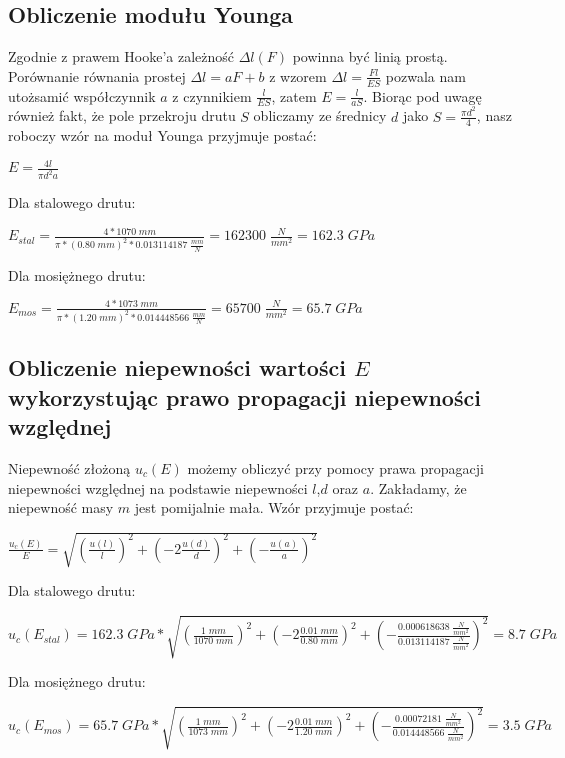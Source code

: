 \documentclass[12pt]{article}
\begin{document}
\subsection{Obliczenie modułu Younga}
Zgodnie z prawem Hooke'a zależność  $\Delta{l}(F)$ powinna być linią prostą. Porównanie równania prostej $\Delta{l} = aF + b$ z wzorem $\Delta{l}=\frac{Fl}{ES}$ pozwala nam utożsamić współczynnik $a$ z czynnikiem $\frac{l}{ES}$, zatem $E=\frac{l}{aS}$. Biorąc pod uwagę również fakt, że pole przekroju drutu $S$
obliczamy ze średnicy $d$ jako $S=\frac{\pi{d^2}}{4}$, nasz roboczy wzór na moduł Younga przyjmuje postać:
\begin{center}
\LARGE $E=\frac{4l}{\pi{d^2}a}$
\end{center}
Dla stalowego drutu:
\begin{center}
\LARGE $E_{stal}=\frac{4*1070\;mm}{\pi*(0.80\;mm)^2*0.013114187 \;\frac{mm}{N}} = 162300\;\frac{N}{mm^2} = 162.3\;GPa $
\end{center}
Dla mosiężnego drutu:
\begin{center}
\LARGE $E_{mos}=\frac{4*1073\;mm}{\pi*(1.20\;mm)^2*0.014448566 \;\frac{mm}{N}} = 65700\;\frac{N}{mm^2} = 65.7\;GPa $
\end{center}
\subsection{Obliczenie niepewności wartości $E$ wykorzystując prawo \newline propagacji niepewności względnej}
Niepewność złożoną $u_c(E)$ możemy obliczyć przy pomocy prawa propagacji niepewności względnej na podstawie niepewności $l$,$d$ oraz $a$. Zakładamy, że niepewność masy $m$ jest pomijalnie mała. Wzór przyjmuje postać:
\begin{center}
\LARGE $\frac{u_c(E)}{E} = \sqrt{(\frac{u(l)}{l})^2+(-2\frac{u(d)}{d})^2+(-\frac{u(a)}{a})^2}$
\end{center}
Dla stalowego drutu:
\begin{center}
\Large $u_c(E_{stal}) = 162.3\;GPa * \sqrt{(\frac{1\;mm}{1070\;mm})^2+(-2\frac{0.01\;mm}{0.80\;mm})^2+(-\frac{0.000618638\;\frac{N}{mm^2}}{0.013114187\;\frac{N}{mm^2}})^2} = 8.7\;GPa$
\end{center}
Dla mosiężnego drutu:
\begin{center}
\Large $u_c(E_{mos}) = 65.7\;GPa * \sqrt{(\frac{1\;mm}{1073\;mm})^2+(-2\frac{0.01\;mm}{1.20\;mm})^2+(-\frac{0.00072181\;\frac{N}{mm^2}}{0.014448566\;\frac{N}{mm^2}})^2} = 3.5\;GPa$
\end{center} 
\end{document}
